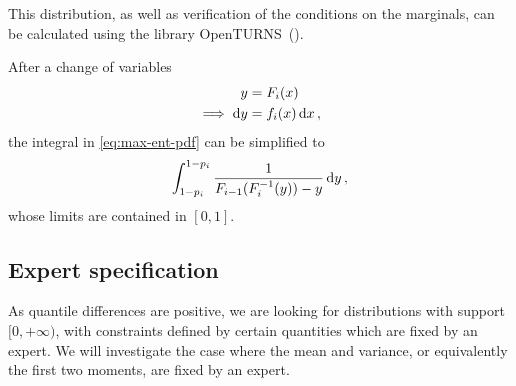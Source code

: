 \documentclass{article}
\newcommand{\dd}{{\rm d}}
\begin{document}
This distribution, as well as verification
of the conditions on the marginals,
can be calculated using the library OpenTURNS~(\cite{OpenTURNS}).
%

%
After a change of variables
%
\begin{align*}
	y &= F_i(x) \\
	\implies \dd y &= f_i(x) \, \dd x \,,
\end{align*}
%
the integral in \eqref{eq:max-ent-pdf} can be simplified to
%
\begin{align*}
	\int_{1 - p_i}^{1 - p_i} \frac{1}{F_{i - 1}(F^{-1}_i(y)) - y}
		\, \dd y \,,
\end{align*}
%
whose limits are contained in $[0, 1]$.
\subsection{Expert specification}
%
As quantile differences are positive,
we are looking for distributions with support $[0, +\infty)$,
with constraints defined by certain quantities which are fixed by an expert.
We will investigate the case where the mean and variance,
or equivalently the first two moments, are fixed by an expert.
%
\end{document}
